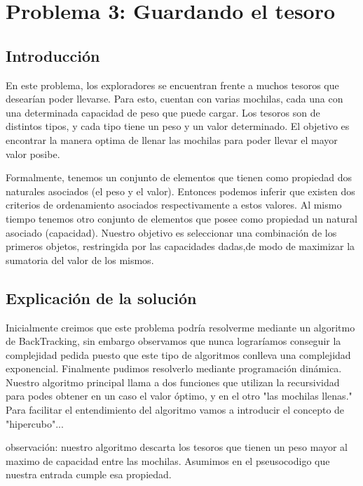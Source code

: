 \documentclass[spanish,12pt]{article}
\begin{document}
\section{Problema 3: Guardando el tesoro}

\subsection{Introducción}

En este problema, los exploradores se encuentran frente a muchos tesoros que desearían poder llevarse. Para esto, cuentan con varias mochilas, cada una con una determinada capacidad de peso que puede cargar.
Los tesoros son de distintos tipos, y cada tipo tiene un peso y un valor determinado.
El objetivo es encontrar la manera optima de llenar las mochilas para poder llevar el mayor valor posibe.

Formalmente, tenemos un conjunto de elementos que tienen como propiedad dos naturales asociados (el peso y el valor). Entonces podemos inferir que existen dos criterios de ordenamiento asociados respectivamente a estos valores.
Al mismo tiempo tenemos otro conjunto de elementos que posee como propiedad un natural asociado (capacidad).
Nuestro objetivo es seleccionar una combinación de los primeros objetos, restringida por las capacidades dadas,de modo de maximizar la sumatoria del valor de los mismos.



\subsection{Explicación de la solución}

   Inicialmente creimos que este problema podría resolverme mediante un algoritmo de BackTracking, sin embargo observamos que nunca lograríamos conseguir la complejidad pedida puesto que este tipo de algoritmos conlleva una complejidad exponencial.
   Finalmente pudimos resolverlo mediante programación dinámica. Nuestro algoritmo principal llama a dos funciones que utilizan la recursividad para podes obtener en un caso el valor óptimo, y en el otro "las mochilas llenas."
   Para facilitar el entendimiento del algoritmo vamos a introducir el concepto de "hipercubo"...%



observación: nuestro algoritmo descarta los tesoros que tienen un peso mayor al maximo de capacidad entre las mochilas. Asumimos en el pseusocodigo que nuestra entrada cumple esa propiedad.
\end{document}
